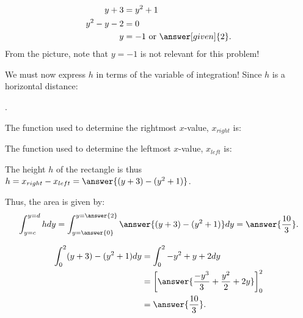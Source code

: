 \documentclass{ximera}
\begin{document}
\begin{exercise}
\begin{exercise}
\begin{exercise}
\begin{exercise}
\begin{hint}
   \begin{align*}
    y+3 &= y^2 +1\\
    y^2-y-2 &= 0\\
    y &= -1 \text{ or }\answer[given]{2}.
  \end{align*}
  From the picture, note that $y=-1$ is not relevant for this problem!
\end{hint}

We must now express $h$ in terms of the variable of integration!  Since $h$ is a horizontal distance: 

\begin{multipleChoice}
.
\end{multipleChoice}

\begin{exercise}

The function used to determine the rightmost $x$-value, $x_{right}$ is:
\begin{multipleChoice}
\end{multipleChoice}

The function used to determine  the leftmost $x$-value, $x_{left}$ is:
\begin{multipleChoice}
\end{multipleChoice}

The height $h$ of the rectangle is thus $h=x_{right}-x_{left} = \answer{(y+3)-(y^2+1)}$.


\begin{exercise}

Thus, the area is given by:
  \[
 \int_{y=c}^{y=d} h dy =  \int_{y=\answer{0}}^{y=\answer{2}} \answer{(y+3) - (y^2+1)} dy = \answer{\frac{10}{3}}.
  \]
  \begin{hint}
    \begin{align*}
      \int_0^2 (y+3) - (y^2+1) dy &= \int_0^2 -y^2+y+2 dy\\
      &=\bigg[\answer{\frac{-y^3}{3} + \frac{y^2}{2}+2y}\bigg]_0^2\\
      &=\answer{\frac{10}{3}}.
    \end{align*}
  \end{hint}

\end{exercise}
\end{exercise}
\end{exercise}
\end{exercise}
\end{exercise}
\end{exercise}
\end{document}
